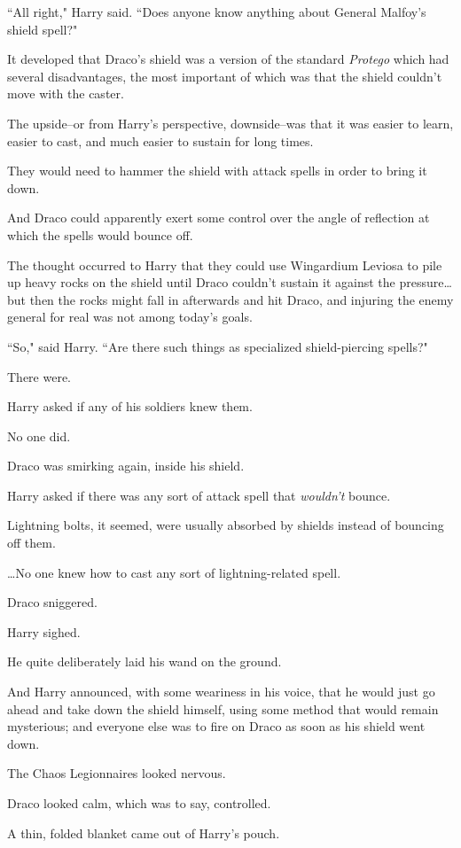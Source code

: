 ``All right," Harry said. ``Does anyone know anything about General Malfoy's shield spell?"

It developed that Draco's shield was a version of the standard \emph{Protego} which had several disadvantages, the most important of which was that the shield couldn't move with the caster.

The upside\---or from Harry's perspective, downside\---was that it was easier to learn, easier to cast, and much easier to sustain for long times.

They would need to hammer the shield with attack spells in order to bring it down.

And Draco could apparently exert some control over the angle of reflection at which the spells would bounce off.

The thought occurred to Harry that they could use Wingardium Leviosa to pile up heavy rocks on the shield until Draco couldn't sustain it against the pressure{\ldots} but then the rocks might fall in afterwards and hit Draco, and injuring the enemy general for real was not among today's goals.

``So," said Harry. ``Are there such things as specialized shield-piercing spells?"

There were.

Harry asked if any of his soldiers knew them.

No one did.

Draco was smirking again, inside his shield.

Harry asked if there was any sort of attack spell that \emph{wouldn't} bounce.

Lightning bolts, it seemed, were usually absorbed by shields instead of bouncing off them.

{\ldots}No one knew how to cast any sort of lightning-related spell.

Draco sniggered.

Harry sighed.

He quite deliberately laid his wand on the ground.

And Harry announced, with some weariness in his voice, that he would just go ahead and take down the shield himself, using some method that would remain mysterious; and everyone else was to fire on Draco as soon as his shield went down.

The Chaos Legionnaires looked nervous.

Draco looked calm, which was to say, controlled.

A thin, folded blanket came out of Harry's pouch.

